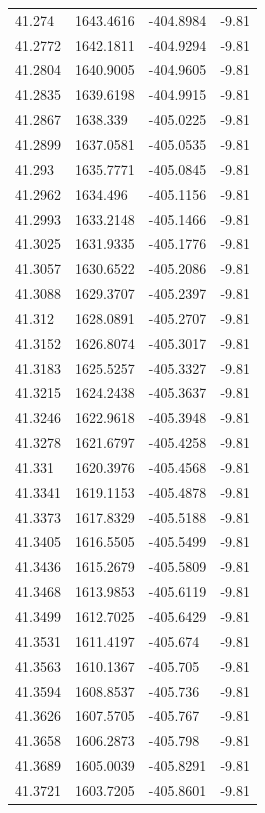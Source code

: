 \begin{table}[H]
\begin{tabular}{llll}
41.274 & 1643.4616 & -404.8984 & -9.81 \\
41.2772 & 1642.1811 & -404.9294 & -9.81 \\
41.2804 & 1640.9005 & -404.9605 & -9.81 \\
41.2835 & 1639.6198 & -404.9915 & -9.81 \\
41.2867 & 1638.339 & -405.0225 & -9.81 \\
41.2899 & 1637.0581 & -405.0535 & -9.81 \\
41.293 & 1635.7771 & -405.0845 & -9.81 \\
41.2962 & 1634.496 & -405.1156 & -9.81 \\
41.2993 & 1633.2148 & -405.1466 & -9.81 \\
41.3025 & 1631.9335 & -405.1776 & -9.81 \\
41.3057 & 1630.6522 & -405.2086 & -9.81 \\
41.3088 & 1629.3707 & -405.2397 & -9.81 \\
41.312 & 1628.0891 & -405.2707 & -9.81 \\
41.3152 & 1626.8074 & -405.3017 & -9.81 \\
41.3183 & 1625.5257 & -405.3327 & -9.81 \\
41.3215 & 1624.2438 & -405.3637 & -9.81 \\
41.3246 & 1622.9618 & -405.3948 & -9.81 \\
41.3278 & 1621.6797 & -405.4258 & -9.81 \\
41.331 & 1620.3976 & -405.4568 & -9.81 \\
41.3341 & 1619.1153 & -405.4878 & -9.81 \\
41.3373 & 1617.8329 & -405.5188 & -9.81 \\
41.3405 & 1616.5505 & -405.5499 & -9.81 \\
41.3436 & 1615.2679 & -405.5809 & -9.81 \\
41.3468 & 1613.9853 & -405.6119 & -9.81 \\
41.3499 & 1612.7025 & -405.6429 & -9.81 \\
41.3531 & 1611.4197 & -405.674 & -9.81 \\
41.3563 & 1610.1367 & -405.705 & -9.81 \\
41.3594 & 1608.8537 & -405.736 & -9.81 \\
41.3626 & 1607.5705 & -405.767 & -9.81 \\
41.3658 & 1606.2873 & -405.798 & -9.81 \\
41.3689 & 1605.0039 & -405.8291 & -9.81 \\
41.3721 & 1603.7205 & -405.8601 & -9.81 \\

\end{tabular}
\end{table}
